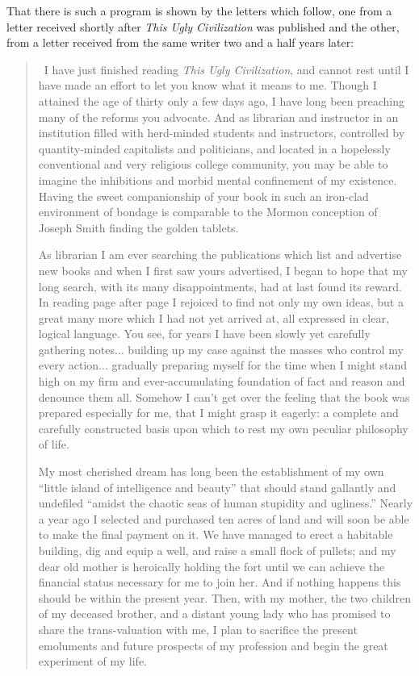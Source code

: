 \documentclass{book}
\begin{document}
That there is such a program is shown by the letters which follow, one from a letter received shortly after \emph{This Ugly Civilization} was published and the other, from a letter received from the same writer two and a half years later:

\begin{quotation}\
	I have just finished reading \emph{This Ugly Civilization}, and cannot rest until I have made an effort to let you know what it means to me. Though I attained the age of thirty only a few days ago, I have long been preaching many of the reforms you advocate. And as librarian and instructor in an institution filled with herd-minded students and instructors, controlled by quantity-minded capitalists and politicians, and located in a hopelessly conventional and very religious college community, you may be able to imagine the inhibitions and morbid mental confinement of my existence. Having the sweet companionship of your book in such an iron-clad environment of bondage is comparable to the Mormon conception of Joseph Smith finding the golden tablets.

	As librarian I am ever searching the publications which list and advertise new books and when I first saw yours advertised, I began to hope that my long search, with its many disappointments, had at last found its reward. In reading page after page I rejoiced to find not only my own ideas, but a great many more which I had not yet arrived at, all expressed in clear, logical language. You see, for years I have been slowly yet carefully gathering notes... building up my case against the masses who control my every action... gradually preparing myself for the time when I might stand high on my firm and ever-accumulating foundation of fact and reason and denounce them all. Somehow I can’t get over the feeling that the book was prepared especially for me, that I might grasp it eagerly: a complete and carefully constructed basis upon which to rest my own peculiar philosophy of life.

	My most cherished dream has long been the establishment of my own “little island of intelligence and beauty” that should stand gallantly and undefiled “amidst the chaotic seas of human stupidity and ugliness.” Nearly a year ago I selected and purchased ten acres of land and will soon be able to make the final payment on it. We have managed to erect a habitable building, dig and equip a well, and raise a small flock of pullets; and my dear old mother is heroically holding the fort until we can achieve the financial status necessary for me to join her. And if nothing happens this should be within the present year. Then, with my mother, the two children of my deceased brother, and a distant young lady who has promised to share the trans-valuation with me, I plan to sacrifice the present emoluments and future prospects of my profession and begin the great experiment of my life.


\end{quotation}
\end{document}
